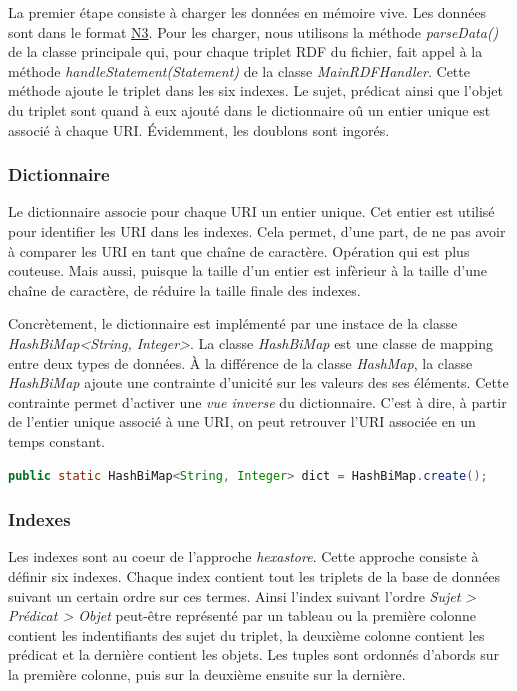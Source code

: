 \documentclass[12pt,titlepage]{article}
\begin{document}
La premier étape consiste à charger les données en mémoire vive. Les données sont dans le format \href{https://fr.wikipedia.org/wiki/Notation3}{N3}. Pour les charger, nous utilisons la méthode \textit{parseData()} de la classe principale qui, pour chaque triplet RDF du fichier, fait appel à la méthode \textit{handleStatement(Statement)} de la classe \textit{MainRDFHandler}. Cette méthode ajoute le triplet dans les six indexes. Le sujet, prédicat ainsi que l'objet du triplet sont quand à eux ajouté dans le dictionnaire oû un entier unique est associé à chaque URI. Évidemment, les doublons sont ingorés.

\subsubsection{Dictionnaire}

Le dictionnaire associe pour chaque URI un entier unique. Cet entier est utilisé pour identifier les URI dans les indexes. Cela permet, d'une part, de ne pas avoir à comparer les URI en tant que chaîne de caractère. Opération qui est plus couteuse. Mais aussi, puisque la taille d'un entier est infèrieur à la taille d'une chaîne de caractère, de réduire la taille finale des indexes.

Concrètement, le dictionnaire est implémenté par une instace de la classe \textit{HashBiMap<String, Integer>}. La classe \textit{HashBiMap} est une classe de mapping entre deux types de données. À la différence de la classe \textit{HashMap}, la classe \textit{HashBiMap} ajoute une contrainte d'unicité sur les valeurs des ses éléments. Cette contrainte permet d'activer une \textit{vue inverse} du dictionnaire. C'est à dire, à partir de l'entier unique associé à une URI, on peut retrouver l'URI associée en un temps constant.

\begin{lstlisting}[language=Java]
	public static HashBiMap<String, Integer> dict = HashBiMap.create();
\end{lstlisting}

\subsubsection{Indexes}

Les indexes sont au coeur de l'approche \textit{hexastore}. Cette approche consiste à définir six indexes. Chaque index contient tout les triplets de la base de données suivant un certain ordre sur ces termes. Ainsi l'index suivant l'ordre \textit{Sujet > Prédicat > Objet} peut-être représenté par un tableau ou la première colonne contient les indentifiants des sujet du triplet, la deuxième colonne contient les prédicat et la dernière contient les objets. Les tuples sont ordonnés d'abords sur la première colonne, puis sur la deuxième ensuite sur la dernière.
\end{document}
